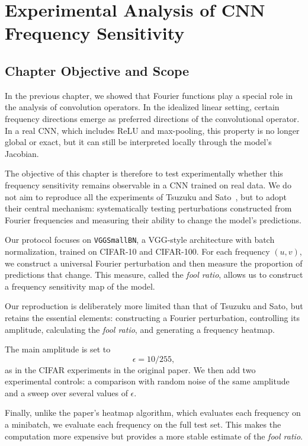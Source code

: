 \chapter{Experimental Analysis of CNN Frequency Sensitivity}

\section{Chapter Objective and Scope}
\label{sec:objectif_positionnement_chapitre4}

In the previous chapter, we showed that Fourier functions play a special role
in the analysis of convolution operators. In the idealized linear setting, certain
frequency directions emerge as preferred directions of the convolutional operator. In a
real CNN, which includes ReLU and max-pooling, this property is no longer global or exact,
but it can still be interpreted locally through the model's Jacobian.

The objective of this chapter is therefore to test experimentally whether this frequency sensitivity remains
observable in a CNN trained on real data. We do not aim to reproduce all
the experiments of Tsuzuku and Sato~\cite{tsuzuku2019structural}, but to adopt their central
mechanism: systematically testing perturbations constructed from Fourier frequencies and
measuring their ability to change the model's predictions.

Our protocol focuses on \texttt{VGGSmallBN}, a VGG-style architecture with batch normalization,
trained on CIFAR-10 and CIFAR-100. For each frequency $(u,v)$,
we construct a universal Fourier perturbation and then measure the proportion of
predictions that change. This measure, called the \textit{fool ratio}, allows us to construct a
frequency sensitivity map of the model.

Our reproduction is deliberately more limited than that of Tsuzuku and Sato, but retains the essential elements: constructing a Fourier perturbation,
controlling its amplitude, calculating the \textit{fool ratio}, and generating a frequency heatmap.

The main amplitude is set to
\[
    \epsilon = 10/255,
\]
as in the CIFAR experiments in the original paper. We then add two experimental
controls: a comparison with random noise of the same amplitude and a sweep over
several values of $\epsilon$.

Finally, unlike the paper's heatmap algorithm, which evaluates each frequency on a
minibatch, we evaluate each frequency on the full test set. This makes the computation
more expensive but provides a more stable estimate of the \textit{fool ratio}.

